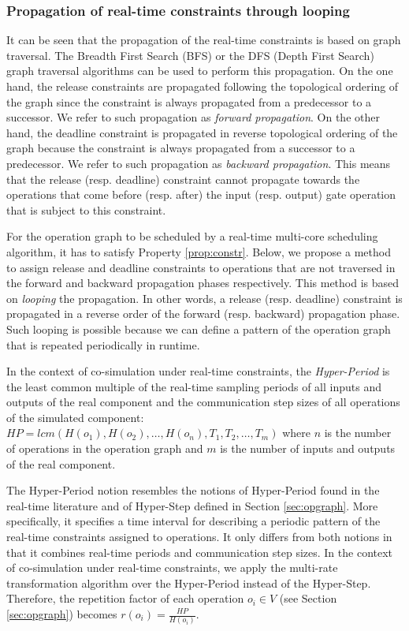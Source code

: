 \subsubsection{Propagation of real-time constraints through looping}

It can be seen that the propagation of the real-time constraints is based on graph traversal. The Breadth First Search (BFS) or the DFS (Depth First Search) graph traversal algorithms can be used to perform this propagation. On the one hand, the release constraints are propagated following the topological ordering of the graph since the constraint is always propagated from a predecessor to a successor. We refer to such propagation as \textit{forward propagation}. On the other hand, the deadline constraint is propagated in reverse topological ordering of the graph because the constraint is always propagated from a successor to a predecessor. We refer to such propagation as \textit{backward propagation}. This means that the release (resp. deadline) constraint cannot propagate towards the operations that come before (resp. after) the input (resp. output) gate operation that is subject to this constraint.

For the operation graph to be scheduled by a real-time multi-core scheduling algorithm, it has to satisfy Property \ref{prop:constr}. Below, we propose a method to assign release and deadline constraints to operations that are not traversed in the forward and backward propagation phases respectively. This method is based on \textit{looping} the propagation. In other words, a release (resp. deadline) constraint is propagated in a reverse order of the forward (resp. backward) propagation phase. Such looping is possible because we can define a pattern of the operation graph that is repeated periodically in runtime.

\begin{definition}
In the context of co-simulation under real-time constraints, the \textit{Hyper-Period} is the least common multiple of the real-time sampling periods of all inputs and outputs of the real component and the communication step sizes of all operations of the simulated component: $HP=lcm(H(o_1),H(o_2), \dots ,\allowbreak H(o_n), T_1, T_2, \dots ,T_m)$ where $n$ is the number of operations in the operation graph and $m$ is the number of inputs and outputs of the real component.
\label{def:hyperperiod}
\end{definition}

The Hyper-Period notion resembles the notions of Hyper-Period found in the real-time literature and of Hyper-Step defined in Section \ref{sec:opgraph}. More specifically, it specifies a time interval for describing a periodic pattern of the real-time constraints assigned to operations. It only differs from both notions in that it combines real-time periods and communication step sizes. In the context of co-simulation under real-time constraints, we apply the multi-rate transformation algorithm over the Hyper-Period instead of the Hyper-Step. Therefore, the repetition factor of each operation $o_i \in V$ (see Section \ref{sec:opgraph}) becomes $r(o_i) = \frac{HP}{H(o_i)}$.

